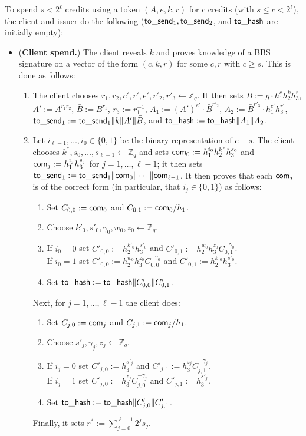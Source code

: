 \documentclass[11pt]{article}
\def\com{{\sf com}}
\def\send{{\sf to}\mbox{\_}{\sf send}}
\def\hash{{\sf to}\mbox{\_}{\sf hash}}
\def\Z{{\mathbb Z}}
\def\bool{\{0,1\}}
\def\Z{{\mathbb Z}}
\begin{document}
\medskip{}
To spend $s<2^\ell$ credits using a token $(A, e, k, r)$ for $c$ credits (with $s \leq c< 2^\ell$), the client and issuer do the following ($\send_1, \send_2$, and $\hash$ are initially empty):
\begin{itemize}
    \item ({\bf Client spend.}) The client reveals $k$ and proves knowledge of a BBS signature on a vector of the form $(c, k, r)$ for some $c, r$ with $c \geq s$. This is done as follows:
    \begin{enumerate}
        \item The client chooses $r_1, r_2, c', r', e', r'_2, r'_3 \leftarrow \Z_q$. It then sets $B:= g \cdot h_1^c h_2^k h_3^r$, $A':=A^{r_1 r_2}$, $\bar B:=B^{r_1}$, $r_3 := r_1^{-1}$,
 $A_1:=(A')^{e'} \cdot \bar B^{r'_2}$, $A_2:= \bar B^{r'_3} \cdot h_1^{c'} h_3^{r'}$, $\send_1:=\send_1\|k\|A'\|\bar B$, and $\hash:=\hash\|A_1\|A_2$.
 
 \item Let $i_{\ell-1}, \ldots, i_0 \in \bool$ be the binary representation of $c-s$. %
The client chooses $k^*, s_0, \ldots, s_{\ell-1} \leftarrow \Z_q$ and sets
$\com_0:=h_1^{i_0} h_2^{k^*} h_3^{s_0}$ and
$\com_j:=h_1^{i_j} h_3^{s_j}$ for $j=1, \ldots, \ell-1$; it then sets $\send_1:=\send_1\|\com_0\|\cdots \|\com_{\ell-1}$.
It then proves that each $\com_j$ is of the correct form (in particular, that $i_j \in \bool$) as follows:
\begin{enumerate}
        \item Set $C_{0,0}:=\com_0$ and $C_{0,1} :=\com_0/h_1$.     
        \item Choose $k'_0, s'_0, \gamma_0, w_0, z_0 \leftarrow \Z_q$.
        \item If $i_0=0$ set $C'_{0,0} := h_2^{k'_0} h_3^{s'_0}$ and $C'_{0,1}:= h_2^{w_0} h_3^{z_0} C_{0,1}^{-\gamma_0}$.\\
              If $i_0=1$ set $C'_{0,0} := h_2^{w_0} h_3^{z_0} C_{0,0}^{-\gamma_0}$ and $C'_{0,1}:= h_2^{k'_0} h_3^{s'_0}$.
        \item Set $\hash:=\hash\|C'_{0,0} \| C'_{0,1}$.
        \end{enumerate}
Next, for $j=1, \ldots, \ell-1$ the client does: \begin{enumerate}
        \item Set $C_{j,0}:=\com_j$ and $C_{j,1} :=\com_j/h_1$.     
        \item Choose $s'_j, \gamma_j, z_j \leftarrow \Z_q$.
        \item If $i_j=0$ set $C'_{j,0} := h_3^{s'_j}$ and $C'_{j,1}:=h_3^{z_j} C_{j,1}^{-\gamma_j}$.\\
              If $i_j=1$ set $C'_{j,0} := h_3^{z_j} C_{j,0}^{-\gamma_j}$ and $C'_{j,1}:=h_3^{s'_j}$.
        \item Set $\hash:=\hash\|C'_{j,0} \| C'_{j,1}$.
        \end{enumerate}
        Finally, it sets  
        $r^* := \sum_{j=0}^{\ell-1} 2^j s_j$.
     

\end{enumerate}
\end{itemize}
\end{document}
